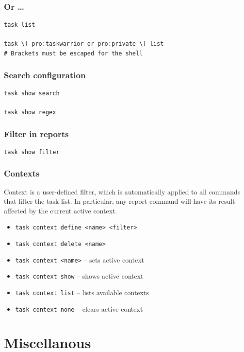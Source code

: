 \documentclass[t,handout]{beamer}
\begin{document}
\begin{frame}[fragile]\frametitle{Or \ldots}
    \vfill
    \begin{lstlisting}
task list

task \( pro:taskwarrior or pro:private \) list
# Brackets must be escaped for the shell\end{lstlisting}
\end{frame}

\begin{frame}[fragile]\frametitle{Search configuration}
    \vfill
    \begin{lstlisting}
task show search

task show regex\end{lstlisting}
\end{frame}

\begin{frame}[fragile]\frametitle{Filter in reports}
    \vfill
    \begin{lstlisting}
task show filter\end{lstlisting}
\end{frame}

\begin{frame}[fragile]\frametitle{Contexts}
    \vfill
       Context is a user-defined filter, which is automatically applied to all commands that filter the task list. In particular, any report command will have its result affected by the current active context.

    \begin{itemize}
        \item \verb+task context define <name> <filter>+
        \item \verb+task context delete <name>+
        \item \verb+task context <name>+ -- sets active context
        \item \verb+task context show+ -- shows active context
        \item \verb+task context list+ -- lists available contexts
        \item \verb+task context none+ -- clears active context
    \end{itemize}
\end{frame}

\section{Miscellanous}
\end{document}
